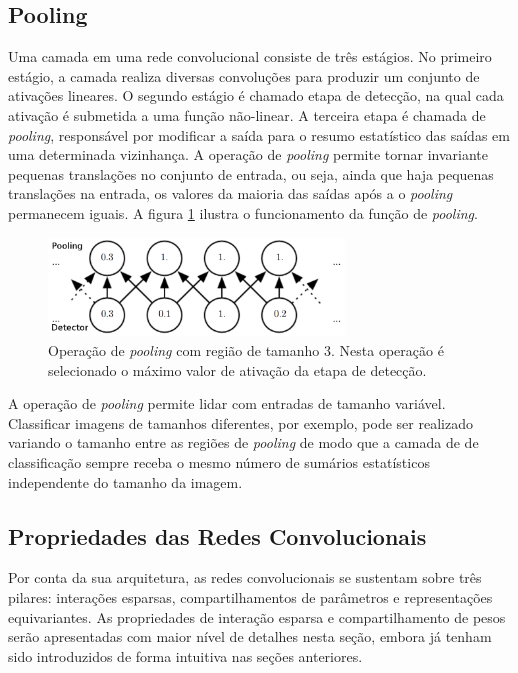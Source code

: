 \subsection{Pooling}
Uma camada em uma rede convolucional consiste de três estágios. No primeiro estágio,
a camada realiza diversas convoluções para produzir um conjunto de ativações lineares.
O segundo estágio é chamado etapa de detecção, na qual cada ativação é submetida a uma
função não-linear. A terceira etapa é chamada de \textit{pooling}, responsável por
modificar a saída para o resumo estatístico das saídas em uma determinada vizinhança. A operação de
\textit{pooling} permite tornar invariante pequenas translações no conjunto de entrada,
ou seja, ainda que haja pequenas translações na entrada, os valores da maioria das saídas após a
o \textit{pooling} permanecem iguais. A figura \ref{fig:pool} ilustra o funcionamento da função de \textit{pooling}.
\begin{figure}[htp]
\begin{center}
  \includegraphics[width=0.7\textwidth]{fig/pool}
  \caption{Operação de \textit{pooling} com região de tamanho 3. Nesta operação é selecionado o máximo valor de ativação da etapa de detecção.}
  \label{fig:pool}
\end{center}
\end{figure}

A operação de \textit{pooling} permite lidar com entradas de tamanho variável.
Classificar imagens de tamanhos diferentes, por exemplo, pode ser realizado
variando o tamanho entre as regiões de \textit{pooling} de modo que a camada de 
de classificação sempre receba o mesmo número de sumários estatísticos
independente do tamanho da imagem.

\subsection{Propriedades das Redes Convolucionais}
Por conta da sua arquitetura, as redes convolucionais se sustentam sobre três pilares: interações esparsas, compartilhamentos
de parâmetros e representações equivariantes. As propriedades de interação esparsa e compartilhamento de pesos serão apresentadas
com maior nível de detalhes nesta seção, embora já tenham sido introduzidos de forma intuitiva nas seções anteriores.

